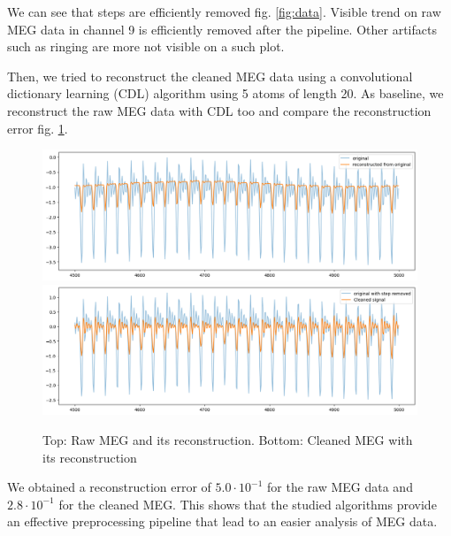 \documentclass[11pt]{article}
\begin{document}
We can see that steps are efficiently removed fig. \ref{fig:data}. Visible trend on raw MEG data in channel 9 is efficiently removed after the pipeline. Other artifacts such as ringing are more not visible on a such plot.

Then, we tried to reconstruct the cleaned MEG data using a convolutional dictionary learning (CDL) algorithm using 5 atoms of length 20. As baseline, we reconstruct the raw MEG data with CDL too and compare the reconstruction error fig. \ref{fig:recons}.

\begin{figure}
    \centering
    \includegraphics[width=.55\textwidth]{recons.png}\\
    \includegraphics[width=.55\textwidth]{recons_clean.png}
    \caption{Top: Raw MEG and its reconstruction. Bottom: Cleaned MEG with its reconstruction}
    \label{fig:recons}
\end{figure}

We obtained a reconstruction error of $5.0\cdot 10^{-1}$ for the raw MEG data and $2.8\cdot 10^{-1}$ for the cleaned MEG. This shows that the studied algorithms provide an effective preprocessing pipeline that lead to an easier analysis of MEG data.

\newpage

\printbibliography[heading=bibintoc]
\end{document}
